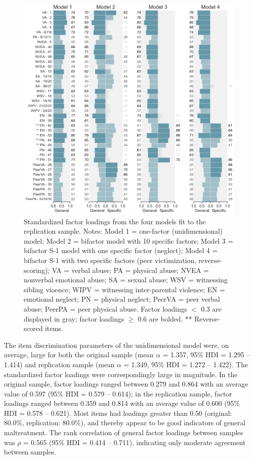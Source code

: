 \documentclass[letterpaper,man,natbib,noextraspace,floatsintext,longtable]{apa6}
\begin{document}
\begin{figure}[tp]
    \centering
    \includegraphics[width=1.1\textwidth,center]{figures/fig03.png}
    \captionsetup{width=1.1\textwidth}
    \caption{Standardized factor loadings from the four models fit to the replication sample. Notes: Model 1 = one-factor (unidimensional) model; Model 2 = bifactor model with 10 specific factors; Model 3 = bifactor S-1 model with one specific factor (neglect); Model 4 = bifactor S-1 with two specific factors (peer victimization, reverse-scoring); VA = verbal abuse; PA = physical abuse; NVEA = nonverbal emotional abuse; SA = sexual abuse; WSV = witnessing sibling vioence; WIPV = witnessing inter-parental violence; EN = emotional neglect; PN = physical neglect; PeerVA = peer verbal abuse; PeerPA = peer physical abuse. Factor loadings $<$ 0.3 are displayed in gray; factor loadings $\geq$ 0.6 are bolded.  ** Reverse-scored items.}
    \label{fig:loadings_online}
\end{figure}

The item discrimination parameters of the unidimensional model were, on average, large for both the original sample (mean $\alpha$ = 1.357, 95\% HDI = 1.295 -- 1.414) and replication sample (mean $\alpha$ = 1.349, 95\% HDI = 1.272 -- 1.422). The standardized factor loadings were correspondingly large in magnitude. In the original sample, factor loadings ranged between 0.279 and 0.864 with an average value of 0.597 (95\% HDI = 0.579 -- 0.614); in the replication sample, factor loadings ranged between 0.359 and 0.814 with an average value of 0.600 (95\% HDI = 0.578 -- 0.621). Most items had loadings greater than 0.50 (original: 80.0\%, replication: 80.0\%), and thereby appear to be good indicators of general maltreatment. The rank correlation of general factor loadings between samples was $\rho$ = 0.565 (95\% HDI = 0.414 -- 0.711), indicating only moderate agreement between samples.
\end{document}
